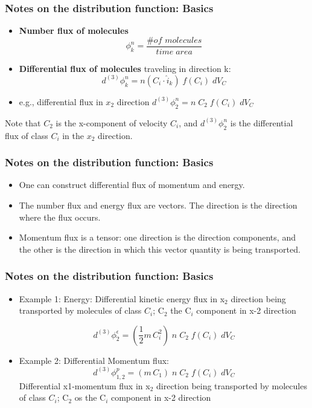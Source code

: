 \documentclass{beamer}
\begin{document}
\begin{frame}
\frametitle{Notes on the distribution function: Basics}
\begin{itemize}

    \item {\bf Number flux  of molecules}
    $$
    \phi^{n}_k = \frac{\# \textit{of molecules}}{\textit{time} \; \textit{area}}
    $$
    \item {\bf Differential flux of molecules} traveling in direction k:
    $$
    d^{(3)} \phi^{n}_k = n \left( C_i \cdot \hat{i}_k \right) \; f (C_i) \; dV_C
    $$
    \item 
    e.g., differential flux  in $x_2$ direction $ d^{(3)} \phi^{n}_2 = n \; C_2  \; f (C_i) \; dV_C$
\end{itemize}
\vskip0.5cm
Note that $C_2$ is the x-component of velocity $C_i$, and $d^{(3)} \phi^{n}_2$ is the differential flux of class $C_i$ in the $x_2$ direction. 

\end{frame}

\begin{frame}
\frametitle{Notes on the distribution function: Basics}
\begin{itemize}
    \item  One can construct differential flux of momentum and energy.
    \item The number flux and energy flux are vectors. The direction is the direction where the flux occurs.
    \item Momentum flux is a tensor: one direction is the direction components, and the other is the direction in which this vector quantity is being transported. 

\end{itemize}


\end{frame}

\begin{frame}
\frametitle{Notes on the distribution function: Basics}

\begin{itemize}
\item Example 1: Energy: Differential kinetic energy flux in x$_2$ direction being transported by molecules of class $C_i$; C$_2$  the C$_i$ component in x-2 direction
 
   $$
    d^{(3)} \phi^{\epsilon}_2 = \left(\frac{1}{2} m \, C^2_i\right) \; n\;  C_2 \; f (C_i) \; dV_C 
    $$
    
\item Example 2: Differential Momentum flux: 
    $$
   d^{(3)} \phi^{p}_{1,2} = \left(m \,  C_1 \right) \; n\; C_2 \; f (C_i) \; dV_C 
   $$
    Differential x1-momentum flux  in x$_2$ direction being transported by molecules of class $C_i$; C$_2$ os the C$_i$ component in x-2 direction
    
\end{itemize}


\end{frame}
\end{document}

